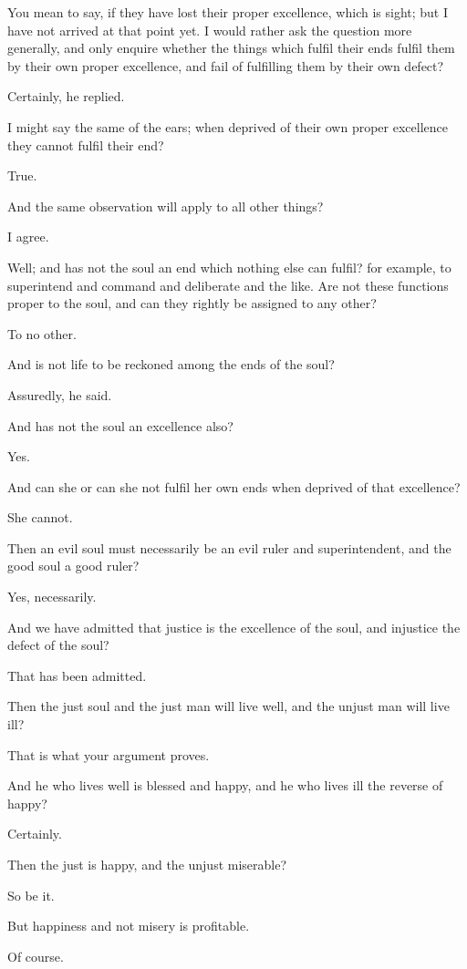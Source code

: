 You mean to say, if they have lost their proper excellence, which is
sight; but I have not arrived at that point yet. I would rather ask
the question more generally, and only enquire whether the things which
fulfil their ends fulfil them by their own proper excellence, and fail
of fulfilling them by their own defect?

Certainly, he replied.

I might say the same of the ears; when deprived of their own proper
excellence they cannot fulfil their end?

True.

And the same observation will apply to all other things?

I agree.

Well; and has not the soul an end which nothing else can fulfil? for
example, to superintend and command and deliberate and the like. Are not
these functions proper to the soul, and can they rightly be assigned to
any other?

To no other.

And is not life to be reckoned among the ends of the soul?

Assuredly, he said.

And has not the soul an excellence also?

Yes.

And can she or can she not fulfil her own ends when deprived of that
excellence?

She cannot.

Then an evil soul must necessarily be an evil ruler and superintendent,
and the good soul a good ruler?

Yes, necessarily.

And we have admitted that justice is the excellence of the soul, and
injustice the defect of the soul?

That has been admitted.

Then the just soul and the just man will live well, and the unjust man
will live ill?

That is what your argument proves.

And he who lives well is blessed and happy, and he who lives ill the
reverse of happy?

Certainly.

Then the just is happy, and the unjust miserable?

So be it.

But happiness and not misery is profitable.

Of course.

